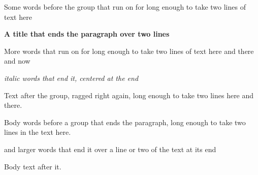 \documentclass{article}
\begin{document}
\begin{titlepage}
\raggedright
Some words before the group that run on for long enough to take two lines of text here
\vspace{1cm}
{\LARGE\bfseries A title that ends the paragraph over two lines\par}
\vspace{2em}
More words that run on for long enough to take two lines of text here and there and now
{\itshape \centering italic words that end it, centered at the end\par}
Text after the group, ragged right again, long enough to take two lines here and there.
\end{titlepage}
Body words before a group that ends the paragraph, long enough to take two lines in the text here.
{\large and larger words that end it over a line or two of the text at its end\par}
Body text after it.
\end{document}
